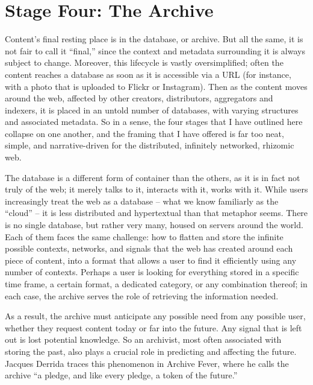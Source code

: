 \section{Stage Four: The Archive}

Content's final resting place is in the database, or archive. But all the same, it is not fair to call it ``final,'' since the context and metadata surrounding it is always subject to change. Moreover, this lifecycle is vastly oversimplified; often the content reaches a database as soon as it is accessible via a URL (for instance, with a photo that is uploaded to Flickr or Instagram). Then as the content moves around the web, affected by other creators, distributors, aggregators and indexers, it is placed in an untold number of databases, with varying structures and associated metadata. So in a sense, the four stages that I have outlined here collapse on one another, and the framing that I have offered is far too neat, simple, and narrative-driven for the distributed, infinitely networked, rhizomic web.

The database is a different form of container than the others, as it is in fact not truly of the web; it merely talks to it, interacts with it, works with it. While users increasingly treat the web as a database – what we know familiarly as the ``cloud'' – it is less distributed and hypertextual than that metaphor seems. There is no single database, but rather very many, housed on servers around the world. Each of them faces the same challenge: how to flatten and store the infinite possible contexts, networks, and signals that the web has created around each piece of content, into a format that allows a user to find it efficiently using any number of contexts. Perhaps a user is looking for everything stored in a specific time frame, a certain format, a dedicated category, or any combination thereof; in each case, the archive serves the role of retrieving the information needed.

As a result, the archive must anticipate any possible need from any possible user, whether they request content today or far into the future. Any signal that is left out is lost potential knowledge. So an archivist, most often associated with storing the past, also plays a crucial role in predicting and affecting the future. Jacques Derrida traces this phenomenon in Archive Fever, where he calls the archive ``a pledge, and like every pledge, a token of the future.'' 


